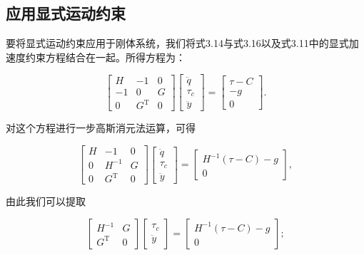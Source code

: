 \documentclass[10pt,a4paper]{book}
\theoremstyle{thmstyle} %
\theoremstyle{defstyle} %
\theoremstyle{prostyle} %
\begin{document}
\subsection{应用显式运动约束}





要将显式运动约束应用于刚体系统，我们将式3.14与式3.16以及式3.11中的显式加速度约束方程结合在一起。所得方程为：



$$
\left[ \begin{array}{lll} { H } & { - 1 } & { 0 } \\{ - 1 } & { 0 } & { G } \\{ 0 } & { G ^{\mathrm { T} } } & { 0 } \end{array} \right] \left[ \begin{array}{l} { \ddot { q } } \\{ \tau _ { c } } \\{ \ddot { y } } \end{array} \right] = \left[ \begin{array}{l} { \tau - C } \\{ - g } \\{ 0 } \end{array} \right] .
$$



对这个方程进行一步高斯消元法运算，可得



$$
\left[ \begin{array}{lll} { H } & { - 1 } & { 0 } \\{ 0 } & { H ^{- 1} } & { G } \\{ 0 } & { G ^{\mathrm { T} } } & { 0 } \end{array} \right] \left[ \begin{array}{l} { \ddot { q } } \\{ \tau _ { c } } \\{ \ddot { y } } \end{array} \right] = \left[ \begin{array}{l} { H ^{- 1} ( \tau - C ) - g } \\{ 0 } \end{array} \right] ,
$$



由此我们可以提取



$$
\left[ \begin{array}{ll} { H ^{- 1} } & { G } \\{ G ^{\mathrm { T} } } & { 0 } \end{array} \right] \left[ \begin{array}{l} { \tau _ { c } } \\{ \ddot { y } } \end{array} \right] = \left[ \begin{array}{ll} { H ^{- 1} ( \tau - C ) - g } \\{ 0 } \end{array} \right] ;
$$
\end{document}
